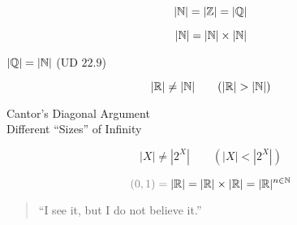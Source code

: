 \begin{frame}{}
  \begin{theorem}[$\aleph_0$ (1874)]
    \[
      |\mathbb{N}| = |\mathbb{Z}| = |\mathbb{Q}|
    \]

    \[
      |\mathbb{N}| = |\mathbb{N}| \times |\mathbb{N}|
    \]
  \end{theorem}

  \pause
  \begin{exampleblock}{$|\mathbb{Q}| = |\mathbb{N}|$ (UD $22.9$)}
  \end{exampleblock}
\end{frame}

\begin{frame}{}
  \begin{theorem}
    \[
      |\mathbb{R}| \neq |\mathbb{N}| \qquad (|\mathbb{R}| > |\mathbb{N}|)
    \]
  \end{theorem}

  \pause
  \vspace{0.60cm}
  \begin{center}
    Cantor's Diagonal Argument  \\[10pt]
    Different ``Sizes'' of Infinity
  \end{center}

  \pause
  \vspace{0.50cm}
  \begin{theorem}
    \[
      |X| \neq |2^{X}| \qquad (|X| < |2^{X}|)
    \]
  \end{theorem}
\end{frame}

\begin{frame}{}
  \begin{theorem}[$\aleph_1$ (1877)]
    \[
      \textcolor{gray}{(0,1) =\;} |\R| = |\R| \times |\R| = |\R|^{n \in \N}
    \]
  \end{theorem}

  \pause
  \vspace{0.80cm}
  \begin{quote}
    \begin{center}
      ``I see it, but I do not believe it.''
    \end{center}
  \end{quote}

  \pause
  \vspace{0.60cm}
  \centerline{}
\end{frame}

